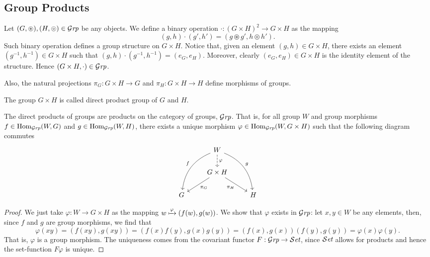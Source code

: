 \subsection{Group Products}

Let \((G, \circledast), (H, \circledcirc) \in {\mathcal{G}\textit{rp}}\) be any objects. We define a
binary operation \(\cdot: (G \times H)^2 \to G \times H\) as the mapping
\begin{equation}\label{eq: grp-prod-bin}
  (g, h) \cdot (g', h') = (g \circledast g', h \circledcirc h').
\end{equation}
Such binary operation defines a group structure on \(G \times H\). Notice that,
given an element \((g, h) \in G \times H\), there exists an element \((g^{-1},
h^{-1}) \in G \times H\) such that \((g, h) \cdot (g^{-1}, h^{-1}) = (e_G,
e_H)\). Moreover, clearly \((e_G, e_H) \in G \times H\) is the identity element
of the structure. Hence \((G \times H, \cdot) \in {\mathcal{G}\textit{rp}}\).

Also, the natural projections \(\pi_G: G \times H \to G\) and \(\pi_H: G \times
H \to H\) define morphisms of groups.

\begin{definition}
  The group \(G \times H\) is called direct product group of \(G\) and \(H\).
\end{definition}

\begin{proposition}
  The direct products of groups are products on the category of groups,
  \({\mathcal{G}\textit{rp}}\). That is, for all group \(W\) and group morphisms \(f \in
  \operatorname{Hom}_{\mathcal{G}\textit{rp}}(W, G)\) and \(g \in \operatorname{Hom}_{\mathcal{G}\textit{rp}}(W, H)\), there exists a unique
  morphism \(\varphi \in \operatorname{Hom}_{\mathcal{G}\textit{rp}}(W, G \times H)\) such that the following
  diagram commutes
  \[
    \begin{tikzcd}
      &W
      \ar[d, dashed, "\varphi"]
      \ar[ddr, bend left, "g"]
      \ar[ddl, swap, bend right, "f"]
      & \\
      &G \times H \ar[dr, swap, "\pi_H"] \ar[dl, "\pi_G"] & \\
      G & &H
    \end{tikzcd}
  \]
\end{proposition}

\begin{proof}
  We just take \(\varphi: W \to G \times H\) as the mapping \(w \xmapsto \varphi
  (f(w), g(w))\). We show that \(\varphi\) exists in \({\mathcal{G}\textit{rp}}\): let \(x, y \in
  W\) be any elements, then, since \(f\) and \(g\) are group morphisms, we find
  that
  \[
    \varphi(xy) = (f(xy), g(xy)) = (f(x) f(y), g(x) g(y))
    = (f(x), g(x)) (f(y), g(y)) = \varphi(x) \varphi(y).
  \]
  That is, \(\varphi\) is a group morphism. The uniqueness comes from the
  covariant functor \(F: {\mathcal{G}\textit{rp}} \to {\mathcal{S}\textit{et}}\), since \({\mathcal{S}\textit{et}}\) allows for products and
  hence the set-function \(F \varphi\) is unique.
\end{proof}

